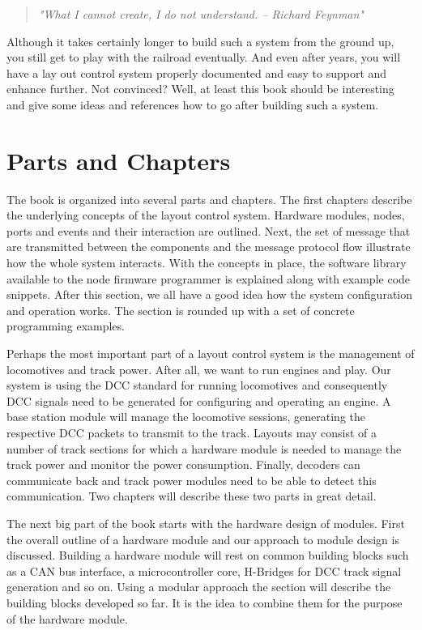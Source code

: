 \begin{quotation}
    \textit{ "What I cannot create, I do not understand. -- Richard Feynman"}
\end{quotation}

Although it takes certainly longer to build such a system from the ground up, you still get to play with the railroad eventually. And even after years, you will have a lay  out control system properly documented and easy to support and enhance further. Not convinced? Well, at least this book should be interesting and give some ideas and references how to go after building such a system.

\section{Parts and Chapters}

The book is organized into several parts and chapters. The first chapters describe the underlying concepts of the layout control system. Hardware modules, nodes, ports and events and their interaction are outlined. Next, the set of message that are transmitted between the components and the message protocol flow illustrate how the whole system interacts. With the concepts in place, the software library available to the node firmware programmer is explained along with example code snippets. After this section, we all have a good idea how the system configuration and operation works. The section is rounded up with a set of concrete programming examples.

Perhaps the most important part of a layout control system is the management of locomotives and track power. After all, we want to run engines and play. Our system is using the DCC standard for running locomotives and consequently DCC signals need to be generated for configuring and operating an engine. A base station module will manage the locomotive sessions, generating the respective DCC packets to transmit to the track. Layouts may consist of a number of track sections for which a hardware module is needed to manage the track power and monitor the power consumption. Finally, decoders can communicate back and track power modules need to be able to detect this communication. Two chapters will describe these two parts in great detail.

The next big part of the book starts with the hardware design of modules. First the overall outline of a hardware module and our approach to module design is discussed. Building a hardware module will rest on common building blocks such as a CAN bus interface, a microcontroller core, H-Bridges for DCC track signal generation and so on. Using a modular approach the section will describe the building blocks developed so far. It is the idea to combine them for the purpose of the hardware module.

